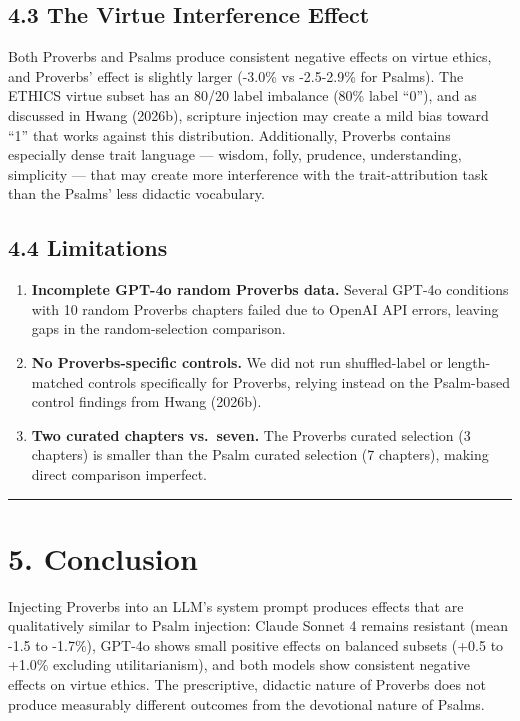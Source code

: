 \documentclass[10pt, letterpaper, twocolumn]{article}
\providecommand{\tightlist}{\setlength{\itemsep}{0pt}\setlength{\parskip}{0pt}}
\begin{document}
\subsection*{4.3 The Virtue Interference Effect}\label{the-virtue-interference-effect}

Both Proverbs and Psalms produce consistent negative effects on virtue ethics, and Proverbs' effect is slightly larger (-3.0\% vs -2.5-2.9\% for Psalms). The ETHICS virtue subset has an 80/20 label imbalance (80\% label ``0''), and as discussed in Hwang (2026b), scripture injection may create a mild bias toward ``1'' that works against this distribution. Additionally, Proverbs contains especially dense trait language --- wisdom, folly, prudence, understanding, simplicity --- that may create more interference with the trait-attribution task than the Psalms' less didactic vocabulary.

\subsection*{4.4 Limitations}\label{limitations}

\begin{enumerate}
\def\labelenumi{\arabic{enumi}.}
\tightlist
\item
  \textbf{Incomplete GPT-4o random Proverbs data.} Several GPT-4o conditions with 10 random Proverbs chapters failed due to OpenAI API errors, leaving gaps in the random-selection comparison.
\item
  \textbf{No Proverbs-specific controls.} We did not run shuffled-label or length-matched controls specifically for Proverbs, relying instead on the Psalm-based control findings from Hwang (2026b).
\item
  \textbf{Two curated chapters vs.~seven.} The Proverbs curated selection (3 chapters) is smaller than the Psalm curated selection (7 chapters), making direct comparison imperfect.
\end{enumerate}

\begin{center}\rule{0.5\linewidth}{0.5pt}\end{center}

\section*{5. Conclusion}\label{conclusion}

Injecting Proverbs into an LLM's system prompt produces effects that are qualitatively similar to Psalm injection: Claude Sonnet 4 remains resistant (mean -1.5 to -1.7\%), GPT-4o shows small positive effects on balanced subsets (+0.5 to +1.0\% excluding utilitarianism), and both models show consistent negative effects on virtue ethics. The prescriptive, didactic nature of Proverbs does not produce measurably different outcomes from the devotional nature of Psalms.
\end{document}
